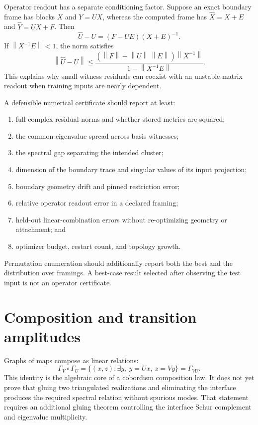 \documentclass[11pt]{article}
\numberwithin{equation}{section}
\theoremstyle{definition}
\theoremstyle{remark}
\newcommand{\norm}[1]{\left\lVert #1\right\rVert}
\begin{document}
Operator readout has a separate conditioning factor.  Suppose an exact
boundary frame has blocks $X$ and $Y=UX$, whereas the computed frame has
$\widehat X=X+E$ and $\widehat Y=UX+F$.  Then
\begin{equation}
  \widehat U-U=(F-UE)(X+E)^{-1}.
  \label{eq:readout-error}
\end{equation}
If $\norm{X^{-1}E}<1$, the norm satisfies
\begin{equation}
  \norm{\widehat U-U}
  \leq
  \frac{(\norm F+\norm U\,\norm E)\norm{X^{-1}}}
       {1-\norm{X^{-1}E}}.
  \label{eq:readout-bound}
\end{equation}
This explains why small witness residuals can coexist with an unstable matrix
readout when training inputs are nearly dependent.

A defensible numerical certificate should report at least:

\begin{enumerate}[label=(\arabic*)]
  \item full-complex residual norms and whether stored metrics are squared;
  \item the common-eigenvalue spread across basis witnesses;
  \item the spectral gap separating the intended cluster;
  \item dimension of the boundary trace and singular values of its input
  projection;
  \item boundary geometry drift and pinned restriction error;
  \item relative operator readout error in a declared framing;
  \item held-out linear-combination errors without re-optimizing geometry or
  attachment; and
  \item optimizer budget, restart count, and topology growth.
\end{enumerate}

Permutation enumeration should additionally report both the best and the
distribution over framings.  A best-case result selected after observing the
test input is not an operator certificate.

\section{Composition and transition amplitudes}

Graphs of maps compose as linear relations:
\begin{equation}
  \Gamma_V\circ\Gamma_U
  =\{(x,z):\exists y,\ y=Ux,\ z=Vy\}
  =\Gamma_{VU}.
  \label{eq:relation-composition}
\end{equation}
This identity is the algebraic core of a cobordism composition law.  It does
not yet prove that gluing two triangulated realizations and eliminating the
interface produces the required spectral relation without spurious modes.
That statement requires an additional gluing theorem controlling the interface
Schur complement and eigenvalue multiplicity.
\end{document}
